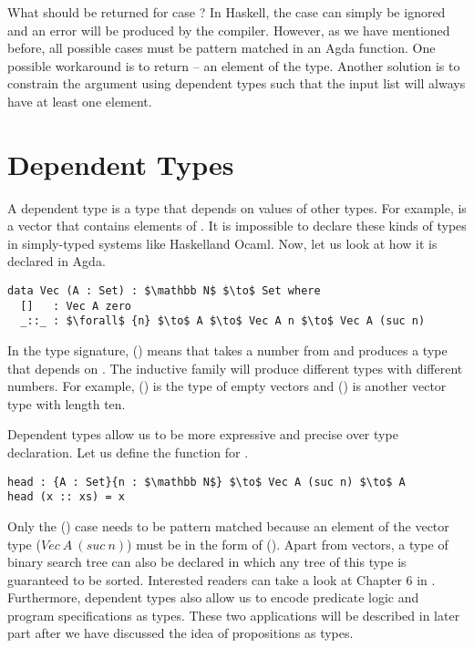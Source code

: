 \par What should be returned for case \mb{[\ ]}? In Haskell, the \mb{[\
  ]} case can simply be ignored and an error will be produced by the
compiler. However, as we have mentioned
before, all possible cases must be pattern matched in an Agda function. One
possible workaround is to return \mb{nothing} -- an element of the
\mb{Maybe} type. Another solution is
to constrain the argument using dependent types such that the input
list will always have at least one element. 


\section{Dependent Types}
\par A dependent type is a type that depends on values of other
types. For example,  is a vector that contains  elements
of \mb{A}. It is impossible to declare these kinds of types in
simply-typed systems like Haskell\footnotemark and Ocaml. Now, let
us look at how it is declared in Agda.
\begin{lstlisting}[mathescape=true,xleftmargin=.25\textwidth]
data Vec (A : Set) : $\mathbb N$ $\to$ Set where
  []   : Vec A zero
  _::_ : $\forall$ {n} $\to$ A $\to$ Vec A n $\to$ Vec A (suc n)
\end{lstlisting} 

\par In the type signature, () means
that  takes a number  from  and produces a
type that depends on \mb{n}. The inductive family \mb{Vec} will
produce different types with different numbers. For example, () is
the type of empty vectors and (\mb{Vec\ A\ 10}) is another vector type with length ten. 

\par Dependent types allow us to be more
expressive and precise over type declaration. Let us define the
 function for . 
\begin{lstlisting}[mathescape=true,xleftmargin=.25\textwidth]
head : {A : Set}{n : $\mathbb N$} $\to$ Vec A (suc n) $\to$ A
head (x :: xs) = x 
\end{lstlisting} 

\par Only the () case needs to be pattern matched because
an element of the vector type (\(Vec\ A\ (suc\ n)\)) must be in the form of
(\mb{x :: xs}). Apart from vectors, a type of binary
search tree can also be declared in which any tree of this type is guaranteed to be
sorted. Interested readers can take a look at 
Chapter 6 in \cite{bove2009}. Furthermore, dependent types also allow
us to encode predicate logic and program specifications as
types. These two applications will be described in later part after we
have discussed the idea of propositions as types. 


